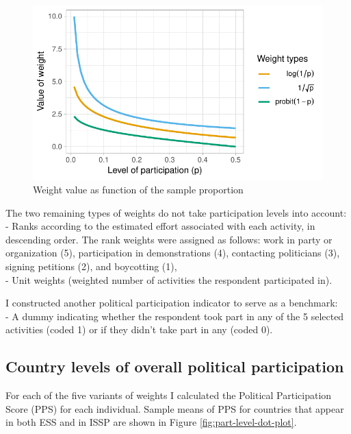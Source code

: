 \documentclass[12pt,]{article}
\begin{document}
\begin{figure}[H]

{\centering \includegraphics{report_files/figure-latex/weights-1} 

}

\caption{Weight value as function of the sample proportion}\label{fig:weights}
\end{figure}

The two remaining types of weights do not take participation levels into account:\\
- Ranks according to the estimated effort associated with each activity, in descending order. The rank weights were assigned as follows: work in party or organization (5), participation in demonstrations (4), contacting politicians (3), signing petitions (2), and boycotting (1),\\
- Unit weights (weighted number of activities the respondent participated in).

I constructed another political participation indicator to serve as a benchmark:\\
- A dummy indicating whether the respondent took part in any of the 5 selected activities (coded 1) or if they didn't take part in any (coded 0).

\hypertarget{country-levels-of-overall-political-participation}{%
\subsection{Country levels of overall political participation}\label{country-levels-of-overall-political-participation}}

For each of the five variants of weights I calculated the Political Participation Score (PPS) for each individual. Sample means of PPS for countries that appear in both ESS and in ISSP are shown in Figure \ref{fig:part-level-dot-plot}.
\end{document}
